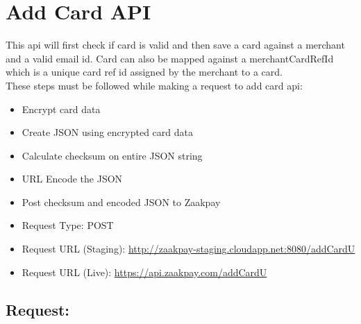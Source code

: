 \documentclass{article}
\begin{document}
\section{Add Card API}
This api will first check if card is valid and then save a card against a merchant and a valid email id. Card can  also be mapped against a merchantCardRefId which is a unique card ref id assigned by the merchant to a card. \\
These steps must be followed while making a request to add card api: 
\begin{itemize}
\item Encrypt card data 
\item Create JSON using encrypted card data 
\item Calculate checksum on entire JSON string 
\item URL Encode the JSON 
\item Post checksum and encoded JSON to Zaakpay 
\item Request Type:	POST 
\item Request URL (Staging): \url{http://zaakpay-staging.cloudapp.net:8080/addCardU}
\item Request URL (Live):	\url{https://api.zaakpay.com/addCardU}
\end{itemize}
\subsection{Request:}
\end{document}
